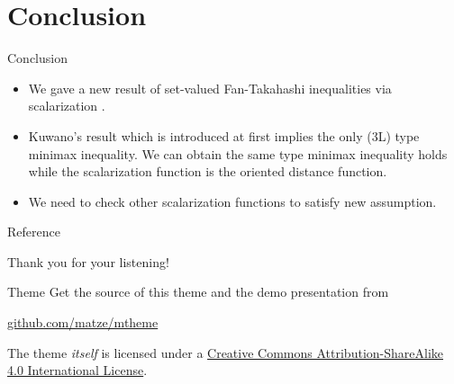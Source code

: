 \documentclass[aspectratio=169, dvipdfmx, 11pt]{beamer}
\begin{document}
\section{Conclusion}

\begin{frame}{Conclusion}
  \begin{itemize}
    \item We gave a new result of set-valued Fan-Takahashi inequalities via scalarization  .
    \item Kuwano's result which is introduced at first implies the only (3L) type minimax inequality.
          We can obtain the same type minimax inequality holds
          while the scalarization function is the oriented distance function.
    \item We need to check other scalarization functions to satisfy new assumption.
  \end{itemize}
\end{frame}

\begin{frame}[allowframebreaks]{Reference}
  \printbibliography
\end{frame}

\begin{frame}
  Thank you for your listening!
\end{frame}

\begin{frame}[noframenumbering]{Theme}
  Get the source of this theme and the demo presentation from

  \begin{center}\url{github.com/matze/mtheme}\end{center}

  The theme \emph{itself} is licensed under a
  \href{http://creativecommons.org/licenses/by-sa/4.0/}{Creative Commons
    Attribution-ShareAlike 4.0 International License}.

  \begin{center}\ccbysa\end{center}
\end{frame}
\end{document}
